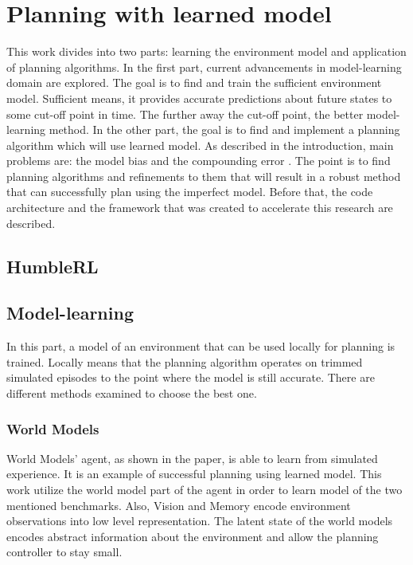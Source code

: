 \section{Planning with learned model}

This work divides into two parts: learning the environment model and application of planning algorithms. In the first part, current advancements in model-learning domain are explored. The goal is to find and train  the sufficient environment model. Sufficient means, it provides accurate predictions about future states to some cut-off point in time. The further away the cut-off point, the better model-learning method.
In the other part, the goal is to find and implement  a planning algorithm which will use learned model. As described in the introduction, main problems are: the model bias and the compounding error . The point is to find planning algorithms and refinements to them that will result in a robust method that can successfully plan using the imperfect model.
Before that, the code architecture and the framework that was created to accelerate this research are described.

\subsection{HumbleRL}

\subsection{Model-learning}

In this part, a model of an environment that can be used locally for planning is trained. Locally means that the planning algorithm operates on trimmed simulated episodes to the point where the model is still accurate. There are different methods examined to choose the best one.

\subsubsection{World Models}

World Models' agent, as shown in the paper\cite{Algo.WorldModels}, is able to learn from simulated experience. It is an example of successful planning using learned model. This work utilize the world model part of the agent in order to learn model of the two mentioned benchmarks. Also, Vision and Memory encode environment observations into low level representation. The latent state of the world models encodes abstract information about the environment and allow the planning controller to stay small.


